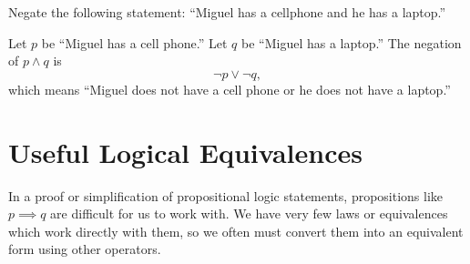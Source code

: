 \begin{ex}
  Negate the following statement:
  ``Miguel has a cellphone and he has a laptop.''
  \begin{sol}
    Let \(p\) be ``Miguel has a cell phone.''
    Let \(q\) be ``Miguel has a laptop.''
    The negation of $p \land q$ is
    \[ \neg p \lor \neg q, \]
    which means ``Miguel does not have a cell phone or he does not have a laptop.''
  \end{sol}
\end{ex}

\section{Useful Logical Equivalences}

In a proof or simplification of propositional logic statements, propositions like $p \implies q$
are difficult for us to work with.
We have very few laws or equivalences which work directly with them, so we often must convert them into an equivalent form using other operators.

